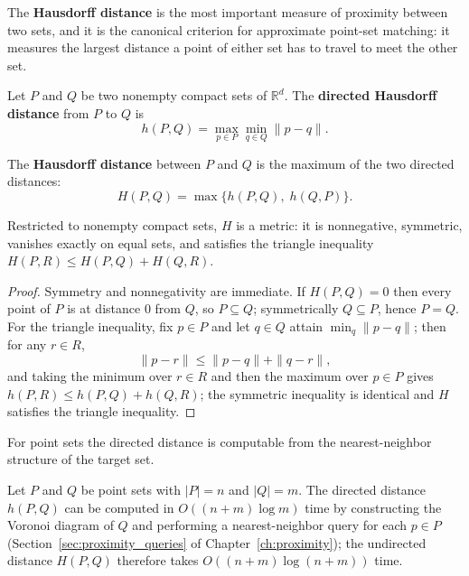 The \textbf{Hausdorff distance} is the most
important measure of proximity between two sets, and it is the canonical
criterion for approximate point-set matching: it measures the largest
distance a point of either set has to travel to meet the other set.

\begin{definition}\label{def:match_directed_hausdorff}
  Let $P$ and $Q$ be two nonempty compact sets of $\mathbb{R}^d$. The
  \textbf{directed Hausdorff distance} from $P$ to $Q$ is
  \[
    h(P, Q) = \max_{p \in P} \min_{q \in Q} \|p - q\| .
  \]
\end{definition}

\begin{definition}\label{def:match_hausdorff}
  The \textbf{Hausdorff distance} between $P$ and $Q$ is the maximum of the
  two directed distances:
  \[
    H(P, Q) = \max\{ h(P,Q),\; h(Q,P) \} .
  \]
\end{definition}

\begin{theorem}\label{thm:match_hausdorff_metric}
  Restricted to nonempty compact sets, $H$ is a metric: it is nonnegative,
  symmetric, vanishes exactly on equal sets, and satisfies the triangle
  inequality $H(P, R) \le H(P,Q) + H(Q,R)$.
\end{theorem}

\begin{proof}
  Symmetry and nonnegativity are immediate. If $H(P,Q) = 0$ then every point
  of $P$ is at distance $0$ from $Q$, so $P \subseteq Q$; symmetrically
  $Q \subseteq P$, hence $P = Q$. For the triangle inequality, fix $p \in P$
  and let $q \in Q$ attain $\min_{q} \|p - q\|$; then for any $r \in R$,
  \[
    \|p - r\| \le \|p - q\| + \|q - r\| ,
  \]
  and taking the minimum over $r \in R$ and then the maximum over $p \in P$
  gives $h(P,R) \le h(P,Q) + h(Q,R)$; the symmetric inequality is identical
  and $H$ satisfies the triangle inequality.
\end{proof}

For point sets the directed distance is computable from the nearest-neighbor
structure of the target set.

\begin{theorem}\label{thm:match_hausdorff_complexity}
  Let $P$ and $Q$ be point sets with $|P| = n$ and $|Q| = m$. The directed
  distance $h(P, Q)$ can be computed in $O((n + m) \log m)$ time by
  constructing the Voronoi diagram of $Q$ and performing a nearest-neighbor
  query for each $p \in P$ (Section~\ref{sec:proximity_queries} of
  Chapter~\ref{ch:proximity}); the undirected distance $H(P,Q)$ therefore
  takes $O((n + m) \log(n + m))$ time.
\end{theorem}

